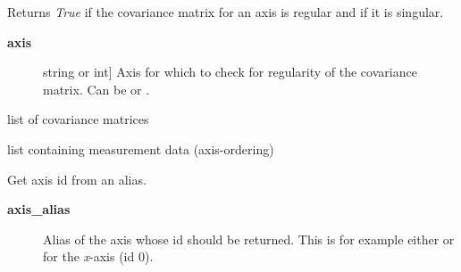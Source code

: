 \documentclass[letterpaper,10pt,english]{sphinxmanual}
\begin{document}
\begin{fulllineitems}
\begin{fulllineitems}
\end{fulllineitems}


\begin{fulllineitems}
\label{api/kafe:kafe.dataset.Dataset.cov_mat_is_regular}
Returns \emph{True} if the covariance matrix for an axis is regular and  if it is
singular.
\begin{description}
\item[{\textbf{axis}}] \leavevmode{[}string or int{]}
Axis for which to check for regularity of the covariance matrix. Can be  or .

\end{description}

\end{fulllineitems}


\begin{fulllineitems}
\label{api/kafe:kafe.dataset.Dataset.cov_mats}
list of covariance matrices

\end{fulllineitems}


\begin{fulllineitems}
\label{api/kafe:kafe.dataset.Dataset.data}
list containing measurement data (axis-ordering)

\end{fulllineitems}


\begin{fulllineitems}
\label{api/kafe:kafe.dataset.Dataset.get_axis}
Get axis id from an alias.
\begin{description}
\item[{\textbf{axis\_alias}}] \leavevmode
Alias of the axis whose id should be returned. This is for example either  or  for the \emph{x}-axis (id 0).

\end{description}

\end{fulllineitems}


\end{fulllineitems}
\end{document}
